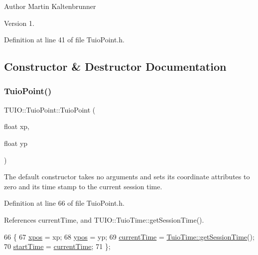 \begin{DoxyAuthor}{Author}
Martin Kaltenbrunner 
\end{DoxyAuthor}
\begin{DoxyVersion}{Version}
1. 
\end{DoxyVersion}


Definition at line 41 of file Tuio\+Point.\+h.



\subsection{Constructor \& Destructor Documentation}
\mbox{\label{class_t_u_i_o_1_1_tuio_point_a8611528cf41b797c51d6a9bf324157a5}} 
\subsubsection{\texorpdfstring{Tuio\+Point()}{TuioPoint()}\hspace{0.1cm}{\footnotesize\ttfamily [1/3]}}
{\footnotesize\ttfamily T\+U\+I\+O\+::\+Tuio\+Point\+::\+Tuio\+Point (\begin{DoxyParamCaption}\item[{float}]{xp,  }\item[{float}]{yp }\end{DoxyParamCaption})\hspace{0.3cm}{\ttfamily [inline]}}

The default constructor takes no arguments and sets its coordinate attributes to zero and its time stamp to the current session time. 

Definition at line 66 of file Tuio\+Point.\+h.



References current\+Time, and T\+U\+I\+O\+::\+Tuio\+Time\+::get\+Session\+Time().


\begin{DoxyCode}
66                                        \{
67             \hyperlink{class_t_u_i_o_1_1_tuio_point_a0021f8dfddd05f2a17e713a94f5457e6}{xpos} = xp;
68             \hyperlink{class_t_u_i_o_1_1_tuio_point_a89a038775a681166168735dbc95c7779}{ypos} = yp;
69             \hyperlink{class_t_u_i_o_1_1_tuio_point_ad04658d52ab78e3e0ddc21584ceaa2ff}{currentTime} = \hyperlink{class_t_u_i_o_1_1_tuio_time_a04e3e660b895b349a26b0364401878b9}{TuioTime::getSessionTime}();
70             \hyperlink{class_t_u_i_o_1_1_tuio_point_ac69cfb9784d5fdc966fba57459d1d8e5}{startTime} = \hyperlink{class_t_u_i_o_1_1_tuio_point_ad04658d52ab78e3e0ddc21584ceaa2ff}{currentTime};
71         \};
\end{DoxyCode}
\mbox{\label{class_t_u_i_o_1_1_tuio_point_a532785ad9572b0e04a0030eac0de99c0}} 
